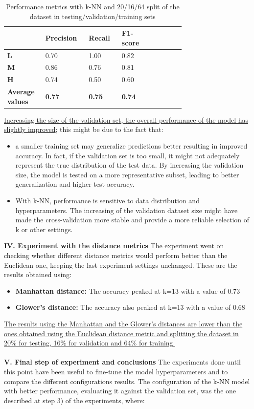\documentclass[11pt,a4paper]{article}
\begin{document}
\begin{table}
\centering
\begin{tabular}{p{0.12\linewidth}|p{0.15\linewidth}|p{0.15\linewidth}|p{0.15\linewidth}|p{0.15\linewidth}} \hline
&\textbf{Precision}&\textbf{Recall}&\textbf{F1-score}\\ \hline
\textbf{L}&0.70&1.00&0.82\\ \hline
\textbf{M}&0.86&0.76&0.81\\ \hline
\textbf{H}&0.74&0.50&0.60\\ \hline
\textbf{Average values}&\textbf{0.77}&\textbf{0.75}&\textbf{0.74}\\ \hline
\end{tabular}
\caption{Performance metrics with k-NN and 20/16/64 split of the dataset in testing/validation/training sets}
\label{tab:Performance metrics with k-NN and 20/16/64 split of the dataset}
\end{table}
\uline{Increasing the size of the validation set, the overall performance of the model has slightly improved}; this might be due to the fact that:
\begin{itemize}
\item a smaller training set may generalize predictions better resulting in improved accuracy. In fact, if the validation set is too small, it might not adequately represent the true distribution of the test data. By increasing the validation size, the model is tested on a more representative subset, leading to better generalization and higher test accuracy.
\item With k-NN, performance is sensitive to data distribution and hyperparameters. The increasing of the validation dataset size might have made the cross-validation more stable and provide a more reliable selection of k or other settings.
\end{itemize}
\textbf{IV. Experiment with the distance metrics}
The experiment went on checking whether different distance metrics would perform better than the Euclidean one, keeping the last experiment settings unchanged.
These are the results obtained using:
\begin{itemize}
\item \textbf{Manhattan distance:} The accuracy peaked at k=13 with a value of 0.73
\item \textbf{Glower’s distance:} The accuracy also peaked at k=13 with a value of 0.68
\end{itemize}
\uline{The results using the Manhattan and the Glower’s distances are lower than the ones obtained using the Euclidean distance metric and splitting the dataset in 20\% for testing, 16\% for validation and 64\% for training.}
\\
\\
\textbf{V. Final step of experiment and conclusions}
The experiments done until this point have been useful to fine-tune the model hyperparameters and to compare the different configurations results. 
The configuration of the k-NN model with better performance, evaluating it against the validation set, was the one described at step 3) of the experiments, where:
\end{document}
